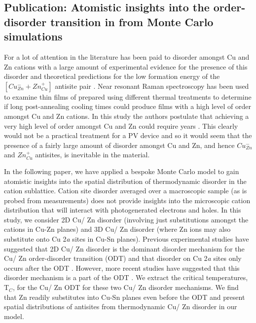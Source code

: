 \documentclass[11pt, twoside]{report}
\begin{document}
\subsection{Publication: Atomistic insights into the order-disorder transition in {\CZTS} from Monte Carlo simulations}\label{CZTS_MC}
For {\CZTS} a lot of attention in the literature has been paid to disorder amongst Cu and Zn cations with a large amount of experimental evidence for the presence of this disorder \cite{Schorr, CZTS_Xray, CZTS_TEM} and theoretical predictions for the low formation energy of the  $[Cu_{Zn}^{-} + Zn_{Cu}^{+}]$ antisite pair \cite{defects_Chen}.
Near resonant Raman spectroscopy has been used to examine thin films of {\CZTS} prepared using different thermal treatments to determine if long post-annealing cooling times could produce films with a high level of order amongst Cu and Zn cations. In this study the authors postulate that achieving a very high level of order amongst Cu and Zn could require years \cite{Katharina}. This clearly would not be a practical treatment for a PV device and so it would seem that the presence of a fairly large amount of disorder amongst Cu and Zn, and hence $Cu_{Zn}^{-}$ and $Zn_{Cu}^{+}$ antisites,  is inevitable in the material. 

In the following paper, we have applied a bespoke Monte Carlo model to gain atomistic insights into the spatial distribution of thermodynamic disorder in the cation sublattice. 
Cation site disorder averaged over a macroscopic sample (as is probed from measurements) does not provide insights into the microscopic cation distribution that will interact with photogenerated electrons and holes.
In this study, we consider 2D Cu/ Zn disorder (involving just substitutions amongst the cations in Cu-Zn planes) and 3D Cu/ Zn disorder (where Zn ions may also substitute onto Cu 2\textit{a} sites in Cu-Sn planes). 
Previous experimental studies have suggested that 2D Cu/ Zn disorder is the dominant disorder mechanism for the Cu/ Zn order-disorder transition (ODT) and that disorder on Cu 2\textit{a} sites only occurs after the ODT \cite{disorder_july}. However, more recent studies have suggested that this disorder mechanism is a part of the ODT \cite{Cu2a_expt, Cu2a_theory}.
We extract the critical temperatures, T$_C$, for the Cu/ Zn ODT for these two Cu/ Zn disorder mechanisms. We find that Zn readily substitutes into Cu-Sn planes even before the ODT and present spatial distributions of antisites from thermodynamic Cu/ Zn disorder in our model.
\end{document}
